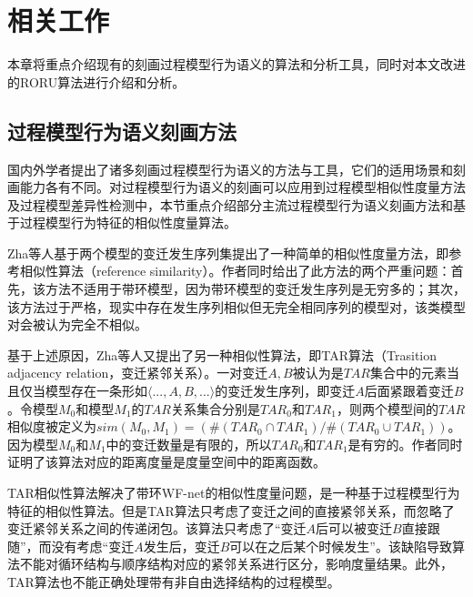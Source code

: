 \chapter{相关工作}\label{cha:related_work}
本章将重点介绍现有的刻画过程模型行为语义的算法和分析工具，同时对本文改进的RORU算法进行介绍和分析。

\section{过程模型行为语义刻画方法}\label{sec:related_algorithms}
国内外学者提出了诸多刻画过程模型行为语义的方法与工具，它们的适用场景和刻画能力各有不同。对过程模型行为语义的刻画可以应用到过程模型相似性度量方法及过程模型差异性检测中，本节重点介绍部分主流过程模型行为语义刻画方法和基于过程模型行为特征的相似性度量算法。

Zha等人基于两个模型的变迁发生序列集提出了一种简单的相似性度量方法，即参考相似性算法（reference similarity）\cite{zha2010workflow}。作者同时给出了此方法的两个严重问题：首先，该方法不适用于带环模型，因为带环模型的变迁发生序列是无穷多的；其次，该方法过于严格，现实中存在发生序列相似但无完全相同序列的模型对，该类模型对会被认为完全不相似。

基于上述原因，Zha等人又提出了另一种相似性算法，即TAR算法（Trasition adjacency relation，变迁紧邻关系）。一对变迁$A,B$被认为是$TAR$集合中的元素当且仅当模型存在一条形如$\langle ...,A,B,...\rangle$的变迁发生序列，即变迁$A$后面紧跟着变迁$B$。令模型$M_{0}$和模型$M_{1}$的$TAR$关系集合分别是$TAR_{0}$和$TAR_{1}$，则两个模型间的$TAR$相似度被定义为$sim(M_{0},M_{1})=(\#(TAR_{0}\cap TAR_{1})/\#(TAR_{0}\cup TAR_{1}))$。因为模型$M_{0}$和$M_{1}$中的变迁数量是有限的，所以$TAR_{0}$和$TAR_{1}$是有穷的。作者同时证明了该算法对应的距离度量是度量空间中的距离函数。

TAR相似性算法解决了带环WF-net的相似性度量问题，是一种基于过程模型行为特征的相似性算法。但是TAR算法只考虑了变迁之间的直接紧邻关系，而忽略了变迁紧邻关系之间的传递闭包。该算法只考虑了“变迁$A$后可以被变迁$B$直接跟随”，而没有考虑“变迁$A$发生后，变迁$B$可以在之后某个时候发生”。该缺陷导致算法不能对循环结构与顺序结构对应的紧邻关系进行区分，影响度量结果。此外，TAR算法也不能正确处理带有非自由选择结构的过程模型。

